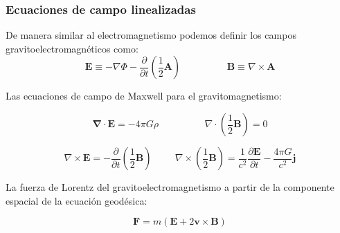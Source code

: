 \documentclass[aspectratio=169,10pt,usenames,dvipsnames,spanish]{beamer}
\begin{document}
\begin{frame}
\frametitle{Ecuaciones de campo linealizadas}
De manera similar al electromagnetismo podemos definir los campos gravitoelectromagnéticos como:
\begin{equation}\label{CamposGEM}
    \mathbf{E}\equiv-\nabla \Phi-\frac{\partial}{\partial t}\left(\frac{1}{2}\mathbf{A}\right) \hspace{2cm} \mathbf{B}\equiv\nabla \times\mathbf{A}
\end{equation}

Las ecuaciones de campo de Maxwell para el gravitomagnetismo:


\begin{equation}\label{GaussGE_GM}
    \mathbf{\nabla}\cdot \mathbf{E}=-4\pi G \rho \hspace{1cm} \hspace{1cm} \nabla \cdot\left(\frac{1}{2} \mathbf{B}\right)=0
\end{equation}

\begin{equation}\label{LeyFaraday GEM1}
    \nabla \times \mathbf{E}=-\frac{\partial}{\partial t} \left(\frac{1}{2}\mathbf{B}\right) \hspace{1cm}     \nabla\times\left(\frac{1}{2}\mathbf{B}\right)=\frac{1}{c^2}\frac{\partial \mathbf{E}}{\partial t}-\frac{4\pi G}{c^2} \mathbf{j}
\end{equation}

La fuerza de Lorentz del gravitoelectromagnetismo a partir de la componente espacial de la ecuación geodésica:

\begin{equation}\label{LorenztGEM1}
    \mathbf{F}=m(\mathbf{E}+2\mathbf{v}\times\mathbf{B})
\end{equation}

\end{frame}

\end{document}
